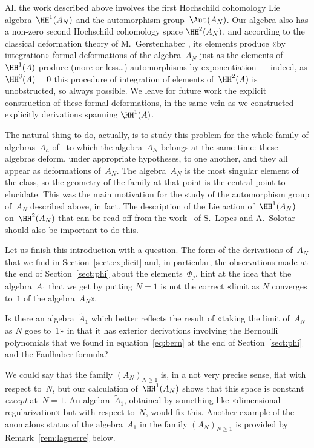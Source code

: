 \bigskip

All the work described above involves the first Hochschild cohomology Lie
algebra~$\HH^1(A_N)$ and the automorphism group~$\Aut(A_N)$. Our algebra
also has a non-zero second Hochschild cohomology space $\HH^2(A_N)$, and
according to the classical deformation theory of M.~Gerstenhaber
\cite{Gerstenhaber:deformation}, its elements produce «by integration»
formal deformations of the algebra~$A_N$ just as the elements of~$\HH^1(A)$
produce (more or less\dots) automorphisms by exponentiation --- indeed, as
$\HH^3(A)=0$ this procedure of integration of elements of~$\HH^2(A)$ is
unobstructed, so always possible. We leave for future work the explicit
construction of these formal deformations, in the same vein as we
constructed explicitly derivations spanning $\HH^1(A)$. 

The natural thing to do, actually, is to study this problem for the whole
family of algebras~$A_h$ of~
to which the algebra~$A_N$ belongs at the same time: these algebras deform,
under appropriate hypotheses, to one another, and they all appear as
deformations of~$A_N$. The algebra~$A_N$ is the most singular element of
the class, so the geometry of the family at that point is the central point
to elucidate. This was the main motivation for the study of the
automorphism group of~$A_N$ described above, in fact. The description of
the Lie action of~$\HH^1(A_N)$ on~$\HH^2(A_N)$ that can be read off from
the work~\cite{LSo} of S.~Lopes and A.~Solotar should also be important to
do this.

\bigskip

Let us finish this introduction with a question. The form of the
derivations of~$A_N$ that we find in Section~\ref{sect:explicit} and, in
particular, the observations made at the end of Section~\ref{sect:phi}
about the elements~$\Phi_j$, hint at the idea that the algebra~$A_1$ that we
get by putting $N=1$ is not the correct «limit as $N$ converges to~$1$ of
the algebra~$A_N$». 

\begin{Question}
Is there an algebra~$\tilde A_1$ which better reflects the result of
«taking the limit of~$A_N$ as $N$ goes to~$1$» in that it has exterior
derivations involving the Bernoulli polynomials that we found in
equation~\eqref{eq:bern} at the end of Section~\ref{sect:phi} and the
Faulhaber formula?
\end{Question}

We could say that the family $(A_N)_{N\geq1}$ is, in a not very precise sense, flat with
respect to~$N$, but our calculation of~$\HH^1(A_N)$ shows that this space
is constant \emph{except} at~$N=1$. An algebra~$\tilde A_1$, obtained by
something like «dimensional regularization» but with respect to~$N$, would
fix this. Another example of the anomalous status of the algebra~$A_1$ in
the family $(A_N)_{N\geq1}$ is provided by Remark~\ref{rem:laguerre} below.
